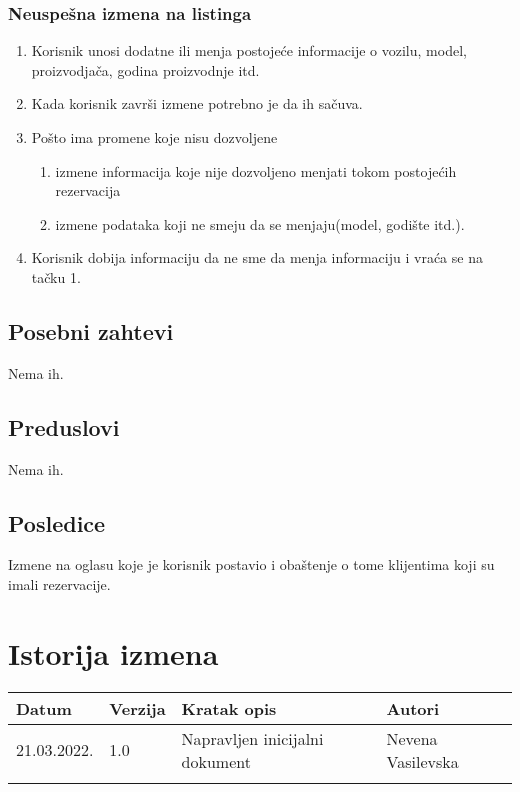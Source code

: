 \documentclass[12pt]{article}
\begin{document}
\subsubsection{Neuspešna izmena na listinga}
\begin{enumerate}
    \item Korisnik unosi dodatne ili menja postojeće informacije o vozilu, model, proizvodjača, godina proizvodnje itd.
    \item Kada korisnik završi izmene potrebno je da ih sačuva.
    \item Pošto ima promene koje nisu dozvoljene 
	\begin{enumerate}
		\item izmene informacija koje nije dozvoljeno menjati tokom postojećih rezervacija 
		\item izmene podataka koji ne smeju da se menjaju(model, godište itd.).
	\end{enumerate}
    \item Korisnik dobija informaciju da ne sme da menja informaciju i vraća se na tačku 1.
\end{enumerate}

\subsection{Posebni zahtevi}
Nema ih.
\subsection{Preduslovi}
Nema ih.
\subsection{Posledice}
Izmene na oglasu koje je korisnik postavio i obaštenje o tome klijentima koji su imali rezervacije.

\section{Istorija izmena}
\begin{center}
\begin{tabular}{ | m{2cm} | m{1.5cm}| m{6cm} | m{5cm} | } 
\hline
Datum & Verzija & Kratak opis & Autori \\ 
\hline
 21.03.2022. & 1.0 & Napravljen inicijalni dokument & Nevena Vasilevska\\ 
\hline
&&&\\ 
\hline
\end{tabular}
\end{center}
\end{document}
